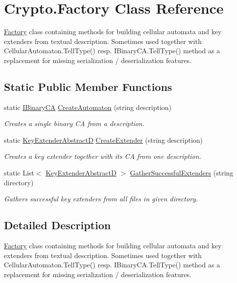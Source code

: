\hypertarget{class_crypto_1_1_factory}{}\section{Crypto.\+Factory Class Reference}
\label{class_crypto_1_1_factory}


\hyperlink{class_crypto_1_1_factory}{Factory} class containing methods for building cellular automata and key extenders from textual description. Sometimes used together with {\ttfamily Cellular\+Automaton.\+Tell\+Type()} resp. {\ttfamily I\+Binary\+C\+A.\+Tell\+Type()} method as a replacement for missing serialization / deserialization features.  


\subsection*{Static Public Member Functions}
\begin{DoxyCompactItemize}
\item 
static \hyperlink{interface_cellular_1_1_i_binary_c_a}{I\+Binary\+C\+A} \hyperlink{class_crypto_1_1_factory_abe3a27bbc69843d3c912605709b75715}{Create\+Automaton} (string description)
\begin{DoxyCompactList}\small\item\em Creates a single binary C\+A from a description. \end{DoxyCompactList}\item 
static \hyperlink{class_crypto_1_1_key_extender_abstract_d}{Key\+Extender\+Abstract\+D} \hyperlink{class_crypto_1_1_factory_aec31ee8205c68b93aa3581aa4d8486d0}{Create\+Extender} (string description)
\begin{DoxyCompactList}\small\item\em Creates a key extender together with its C\+A from one description. \end{DoxyCompactList}\item 
static List$<$ \hyperlink{class_crypto_1_1_key_extender_abstract_d}{Key\+Extender\+Abstract\+D} $>$ \hyperlink{class_crypto_1_1_factory_abd5015e25ff66c3cf46bab4d67e60ce5}{Gather\+Successful\+Extenders} (string directory)
\begin{DoxyCompactList}\small\item\em Gathers successful key extenders from all files in given directory. \end{DoxyCompactList}\end{DoxyCompactItemize}


\subsection{Detailed Description}
\hyperlink{class_crypto_1_1_factory}{Factory} class containing methods for building cellular automata and key extenders from textual description. Sometimes used together with {\ttfamily Cellular\+Automaton.\+Tell\+Type()} resp. {\ttfamily I\+Binary\+C\+A.\+Tell\+Type()} method as a replacement for missing serialization / deserialization features. 



